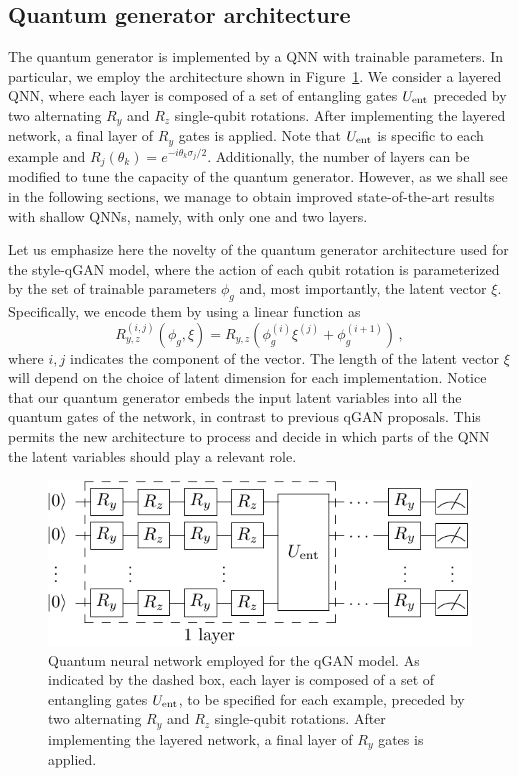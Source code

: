 \documentclass[twocolumn,preprintnumbers,superscriptaddress]{revtex4-2}
\begin{document}
\subsection{Quantum generator architecture}
The quantum generator is implemented by a QNN with trainable parameters. In particular, we employ the architecture shown in Figure~\ref{fig:circuit}. We consider a layered QNN, where each layer is composed of a set of entangling gates $U_{\rm ent}$ preceded by two alternating $R_y$ and $R_z$ single-qubit rotations. After implementing the layered network, a final layer of $R_y$ gates is applied. Note that $U_{\rm ent}$ is specific to each example and $R_j(\theta_k) = e^{-i\theta_k \sigma_j /2}$. Additionally, the number of layers can be modified to tune the capacity of the quantum generator. However, as we shall see in the following sections, we manage to obtain improved state-of-the-art results with shallow QNNs, namely, with only one and two layers.

Let us emphasize here the novelty of the quantum generator architecture used for the style-qGAN model, where the action of each qubit rotation is parameterized by the set of trainable parameters $\phi_g$ and, most importantly, the latent vector $\xi$. Specifically, we encode them by using a linear function as
\begin{equation}
    \label{eq:rotation} R_{y,z}^{(i,j)}\left(\phi_g, \xi\right) = R_{y,z}\left(\phi_g^{(i)} \xi^{(j)} + \phi_g^{(i+1)}\right)\,,
\end{equation}
where $i,j$ indicates the component of the vector. The length of the latent vector $\xi$ will depend on the choice of latent dimension for each implementation. Notice that our quantum generator embeds the input latent variables into all the quantum gates of the network, in contrast to previous qGAN proposals. This permits the new architecture to process and decide in which
parts of the QNN the latent variables should play a relevant role.

\begin{figure}
  \includegraphics[width=1.0\columnwidth]{plots/ansatz1.pdf}
  \caption{\label{fig:circuit}Quantum neural network employed for the qGAN model. As indicated by the dashed box, each layer is composed of a set of entangling gates $U_{\rm ent}$, to be specified for each example, preceded by two alternating $R_y$ and $R_z$ single-qubit rotations. After implementing the layered network, a final layer of $R_y$ gates is applied.}
\end{figure}
\end{document}
